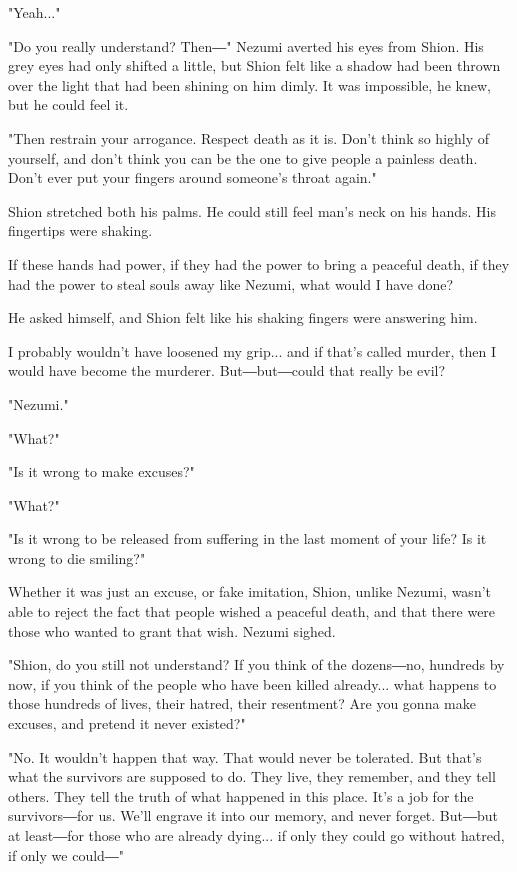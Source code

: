 "Yeah..."

"Do you really understand? Then―" Nezumi averted his eyes from Shion.
His grey eyes had only shifted a little, but Shion felt like a shadow
had been thrown over the light that had been shining on him dimly. It
was impossible, he knew, but he could feel it.

"Then restrain your arrogance. Respect death as it is. Don't think so
highly of yourself, and don't think you can be the one to give people a
painless death. Don't ever put your fingers around someone's throat
again."

Shion stretched both his palms. He could still feel man's neck on his
hands. His fingertips were shaking.

If these hands had power, if they had the power to bring a peaceful
death, if they had the power to steal souls away like Nezumi, what would
I have done?

He asked himself, and Shion felt like his shaking fingers were answering
him.

I probably wouldn't have loosened my grip... and if that's called
murder, then I would have become the murderer. But―but―could that really
be evil?

"Nezumi."

"What?"

"Is it wrong to make excuses?"

"What?"

"Is it wrong to be released from suffering in the last moment of your
life? Is it wrong to die smiling?"

Whether it was just an excuse, or fake imitation, Shion, unlike Nezumi,
wasn't able to reject the fact that people wished a peaceful death, and
that there were those who wanted to grant that wish. Nezumi sighed.

"Shion, do you still not understand? If you think of the dozens―no,
hundreds by now, if you think of the people who have been killed
already... what happens to those hundreds of lives, their hatred, their
resentment? Are you gonna make excuses, and pretend it never existed?"

"No. It wouldn't happen that way. That would never be tolerated. But
that's what the survivors are supposed to do. They live, they remember,
and they tell others. They tell the truth of what happened in this
place. It's a job for the survivors―for us. We'll engrave it into our
memory, and never forget. But―but at least―for those who are already
dying... if only they could go without hatred, if only we could―"

